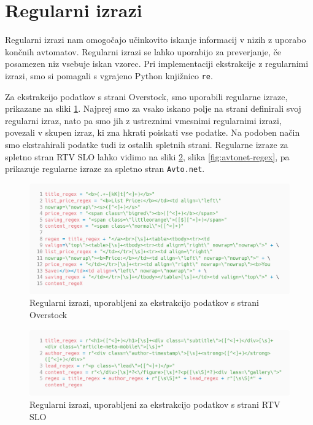 \documentclass[conference]{IEEEtran}
\begin{document}
	\section{Regularni izrazi}
	
	Regularni izrazi nam omogočajo učinkovito iskanje informacij v nizih z uporabo končnih avtomatov. Regularni izrazi se lahko uporabijo za preverjanje, če posamezen niz vsebuje iskan vzorec. Pri implementaciji ekstrakcije z regularnimi izrazi, smo si pomagali s vgrajeno Python knjižnico \texttt{re}. 
	
	Za ekstrakcijo podatkov s strani Overstock, smo uporabili regularne izraze, prikazane na sliki \ref{fig:overstock-regex}. Najprej smo za vsako iskano polje na strani definirali svoj regularni izraz, nato pa smo jih z ustreznimi vmesnimi regularnimi izrazi, povezali v skupen izraz, ki zna hkrati poiskati vse podatke. Na podoben način smo ekstrahirali podatke tudi iz ostalih spletnih strani. Regularne izraze za spletno stran RTV SLO lahko vidimo na sliki \ref{fig:rtvslo-regex}, slika \ref{fig:avtonet-regex}, pa prikazuje regularne izraze za spletno stran \texttt{Avto.net}.
	
	\begin{figure}
		\centering
		\includegraphics[width=0.9\linewidth]{images/overstock_regex}
		\caption{Regularni izrazi, uporabljeni za ekstrakcijo podatkov s strani Overstock}
		\label{fig:overstock-regex}
	\end{figure}

	\begin{figure}
		\centering
		\includegraphics[width=0.9\linewidth]{images/rtvslo_regex}
		\caption{Regularni izrazi, uporabljeni za ekstrakcijo podatkov s strani RTV SLO}
		\label{fig:rtvslo-regex}
	\end{figure}
\end{document}
